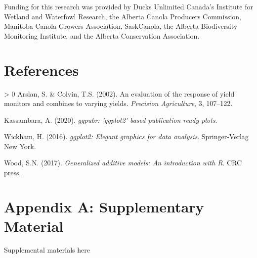 \documentclass[]{elsarticle} %
\newlength{\cslhangindent}
\newenvironment{CSLReferences}[3] %
 {%
  \setlength{\parindent}{0pt}
  \ifodd #1 \everypar{\setlength{\hangindent}{\cslhangindent}}\ignorespaces\fi
  \ifnum #2 > 0
  \setlength{\parskip}{#2\baselineskip}
  \fi
 }%
 {}
\begin{document}
Funding for this research was provided by Ducks Unlimited Canada's Institute for Wetland and Waterfowl Research, the Alberta Canola Producers Commission, Manitoba Canola Growers Association, SaskCanola, the Alberta Biodiversity Monitoring Institute, and the Alberta Conservation Association.

\hypertarget{references}{%
\section*{References}\label{references}}

\hypertarget{refs}{}
\begin{CSLReferences}{1}{0}
\leavevmode\hypertarget{ref-arslan2002}{}%
Arslan, S. \& Colvin, T.S. (2002). An evaluation of the response of yield monitors and combines to varying yields. \emph{Precision Agriculture}, 3, 107--122.

\leavevmode\hypertarget{ref-kassambara2020}{}%
Kassambara, A. (2020). \emph{{ggpubr}: 'ggplot2' based publication ready plots}.

\leavevmode\hypertarget{ref-wickham2016}{}%
Wickham, H. (2016). \emph{{ggplot2}: Elegant graphics for data analysis}. Springer-Verlag New York.

\leavevmode\hypertarget{ref-wood2017}{}%
Wood, S.N. (2017). \emph{Generalized additive models: An introduction with {R}}. CRC press.

\end{CSLReferences}

\newpage

\hypertarget{appendix-a-supplementary-material}{%
\section*{Appendix A: Supplementary Material}\label{appendix-a-supplementary-material}}

Supplemental materials here
\end{document}
